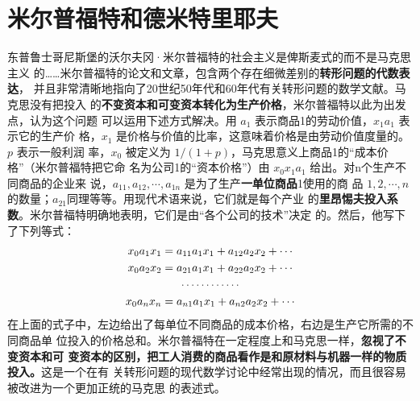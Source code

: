 \section{米尔普福特和德米特里耶夫}
东普鲁士哥尼斯堡的沃尔夫冈·米尔普福特的社会主义是俾斯麦式的而不是马克思主义
的……米尔普福特的论文和文章，包含两个存在细微差别的\textbf{转形问题的代数表达}，
并且非常清晰地指向了20世纪50年代和60年代有关转形问题的数学文献。马克思没有把投入
的\textbf{不变资本和可变资本转化为生产价格}，米尔普福特以此为出发点，认为这个问题
可以运用下述方式解决。用 $a_1$ 表示商品1的劳动价值，$x_1a_1$ 表示它的生产价
格，$x_1$ 是价格与价值的比率，这意味着价格是由劳动价值度量的。$p$ 表示一般利润
率，$x_0$ 被定义为 $1 /(1+p)$，马克思意义上商品1的“成本价格”（米尔普福特把它命
名为公司1的“资本价格”）由 $x_0x_1a_1$ 给出。对n个生产不同商品的企业来
说，$a_{11},a_{12},\cdots,a_{1n}$ 是为了生产\textbf{一单位商品}1使用的商
品 $1,2,\cdots,n$的数量；$a_{21}$同理等等。用现代术语来说，它们就是每个产业
的\textbf{里昂惕夫投入系数}。米尔普福特明确地表明，它们是由“各个公司的技术”决定
的。然后，他写下了下列等式：
\begin{gather}
  x_0a_1x_1=a_{11}a_1x_1 + a_{12}a_2x_2 + \cdots  \notag \\
  x_0a_2x_2=a_{21}a_1x_1 + a_{22}a_2x_2 + \cdots \notag \\
  \cdots \cdots \cdots \cdots \notag \\ 
  x_0a_nx_n=a_{n1}a_1x_1 + a_{n2}a_2x_2 + \cdots 
\end{gather}
在上面的式子中，左边给出了每单位不同商品的成本价格，右边是生产它所需的不同商品单
位投入的价格总和。米尔普福特在一定程度上和马克思一样，\textbf{忽视了不变资本和可
  变资本的区别，把工人消费的商品看作是和原材料与机器一样的物质投入。}这是一个在有
关转形问题的现代数学讨论中经常出现的情况，而且很容易被改进为一个更加正统的马克思
的表述式。

